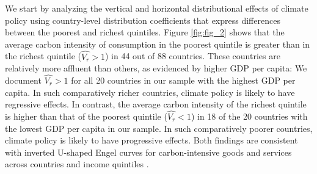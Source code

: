 \documentclass[12pt, a4paper]{article}
\begin{document}
We start by analyzing the vertical and horizontal distributional effects of climate policy using country-level distribution coefficients that express differences between the poorest and richest quintiles. Figure \ref{fig:fig_2} shows that the average carbon intensity of consumption in the poorest quintile is greater than in the richest quintile ($\widehat{V_{r}}>1$) in 44 out of 88 countries. These countries are relatively more affluent than others, as evidenced by higher GDP per capita: We document $\widehat{V_{r}}>1$ for all 20 countries in our sample with the highest GDP per capita. In such comparatively richer countries, climate policy is likely to have regressive effects. In contrast, the average carbon intensity of the richest quintile is higher than that of the poorest quintile ($\widehat{V_{r}}<1$) in 18 of the 20 countries with the lowest GDP per capita in our sample. In such comparatively poorer countries, climate policy is likely to have progressive effects. Both findings are consistent with inverted U-shaped Engel curves for carbon-intensive goods and services across countries and income quintiles \autocite{Dorband.2019}. 
\end{document}
